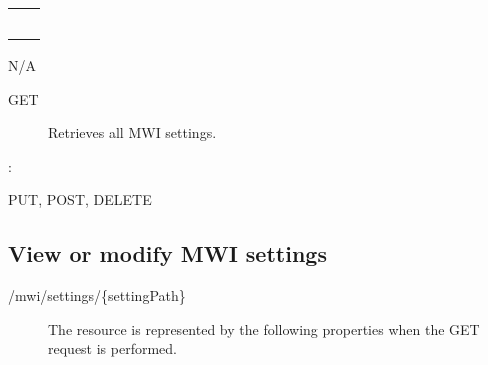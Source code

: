 \documentclass[letterpaper,10pt,english]{sphinxmanual}
\begin{document}
\begin{savenotes}\sphinxattablestart
\centering
\begin{tabulary}{\linewidth}[t]{|T|T|}
\hline

&
\\
\hline
{}
&\\
\hline
{}
&\\
\hline
{}
&\\
\hline
{}
&\\
\hline
{}
&\\
\hline
\end{tabulary}
\par
\sphinxattableend\end{savenotes}

 N/A
\begin{description}
\item[{ GET}] \leavevmode
Retrieves all MWI settings.

\end{description}

:

\begin{sphinxVerbatim}[commandchars=\\\{\}]
\end{sphinxVerbatim}

 PUT, POST, DELETE


\subsection{View or modify MWI settings}
\label{\detokenize{restapi:view-or-modify-mwi-settings}}
 /mwi/settings/\{settingPath\}
\begin{description}
\item[{}] \leavevmode
The resource is represented by the following properties when the GET request is performed.

\end{description}


\begin{savenotes}\sphinxattablestart
\centering
\begin{tabulary}{\linewidth}[t]{|T|T|}
\hline

&
\\
\hline
\end{tabulary}
\par
\sphinxattableend\end{savenotes}
\end{document}
